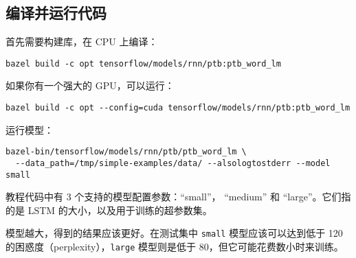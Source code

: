 \begin{Shaded}
\begin{Highlighting}[]
\OperatorTok{=} 
\OperatorTok{=} \OperatorTok{*} 

\OperatorTok{=} \OperatorTok{=} 
  \NormalTok{(}
    \OperatorTok{=} 


\OperatorTok{=} 
\end{Highlighting}
\end{Shaded}

\subsection{编译并运行代码
}\label{ux7f16ux8bd1ux5e76ux8fd0ux884cux4ee3ux7801}

首先需要构建库，在 CPU 上编译：

\begin{verbatim}
bazel build -c opt tensorflow/models/rnn/ptb:ptb_word_lm
\end{verbatim}

如果你有一个强大的 GPU，可以运行：

\begin{verbatim}
bazel build -c opt --config=cuda tensorflow/models/rnn/ptb:ptb_word_lm
\end{verbatim}

运行模型：

\begin{verbatim}
bazel-bin/tensorflow/models/rnn/ptb/ptb_word_lm \
  --data_path=/tmp/simple-examples/data/ --alsologtostderr --model small
\end{verbatim}

教程代码中有 3 个支持的模型配置参数：``small''， ``medium'' 和
``large''。它们指的是 LSTM 的大小，以及用于训练的超参数集。

模型越大，得到的结果应该更好。在测试集中 \texttt{small}
模型应该可以达到低于 120 的困惑度（perplexity），\texttt{large}
模型则是低于 80，但它可能花费数小时来训练。

